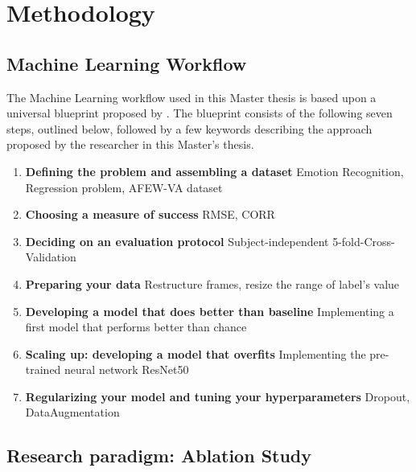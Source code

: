 \chapter{Methodology}

\section{Machine Learning Workflow}
The Machine Learning workflow used in this Master thesis is based upon a universal blueprint proposed by \citet{Chollet:2017:DeepLearningPython}. The blueprint consists of the following seven steps, outlined below, followed by a few keywords describing the approach proposed by the researcher in this Master's thesis.

\begin{enumerate}
    \item \textbf{Defining the problem and assembling a dataset}\newline
    Emotion Recognition, Regression problem, AFEW-VA dataset
    \item \textbf{Choosing a measure of success}\newline
    RMSE, CORR
    \item \textbf{Deciding on an evaluation protocol}\newline
    Subject-independent 5-fold-Cross-Validation
    \item \textbf{Preparing your data}\newline
    Restructure frames, resize the range of label's value
    \item \textbf{Developing a model that does better than baseline}\newline
    Implementing a first model that performs better than chance
    \item \textbf{Scaling up: developing a model that overfits}\newline
    Implementing the pre-trained neural network ResNet50
    \item \textbf{Regularizing your model and tuning your hyperparameters}\newline
    Dropout, DataAugmentation
\end{enumerate}



\section{Research paradigm: Ablation Study}

